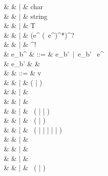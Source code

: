 \documentclass[a4paper]{article}
\begin{document}
{\begin{grammar}
                                    &              & |   &  char  \\
                                    &              & |   &  string  \\
                                    &              & |   & T\ \varepsilon \\
                                    &              & |   & \code{(} (e^{} (\code{,}\ e^{})^*)^? \code{)} \\
                                    &              & |   & \code{\#} \code{\{} ^! \code{\}} \\
             & {e_b}^{}  & ::= & e_b'\ |\ e_b' \code{;}\ e^{}\\
                                    & e_b'         &     & \hspace{-2em}  \\
                                    &              & ::= &\varepsilon {} v \\
                                    &              & |   & ( | )\ \varepsilon \\
                                    &              & |   & \varepsilon\ \varepsilon \\
                                    &              & |   & \varepsilon\ \code{\{}   \code{\}} \\
                                    &              & |   & \varepsilon\ (\code{*} | \code{/} | \code{\%})\ \varepsilon \\
                                    &              & |   & \varepsilon\ (\code{+} | \code{-})\ \varepsilon \\
                                    &              & |   & \varepsilon\ (\code{>=} | \code{>} | \code{==} | \code{/=} | \code{<} | \code{<=})\ \varepsilon \\
                                    &              & |   & \varepsilon\ \ \varepsilon {} \\
                                    &              & |   & \varepsilon\ \ \varepsilon {} \\
                                    &              & |   & \varepsilon\ \ \varepsilon {} \\
                                    &              & |   & \varepsilon\ (\code{>}\code{>} | \code{<}\code{<})\ \varepsilon \\

\end{grammar}}
\end{document}
